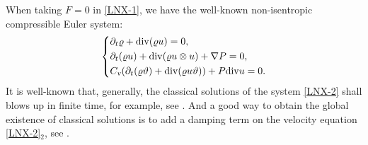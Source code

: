 \documentclass[reqno,11pt]{amsart}
\theoremstyle{plain}
\numberwithin{equation}{section}
\begin{document}
 
 
When taking $F = 0$ in \eqref{LNX-1}, we have the well-known non-isentropic compressible Euler system:
\begin{equation}\label{LNX-2}
\left\{\begin{aligned}& \partial_t \varrho+{\rm div}(\varrho u)=0, \\&\partial_t (\varrho u) 
+ {\rm div} (\varrho u \otimes u)  + \nabla P=0, \\
& C_\textsl{v}(\partial_t (\varrho \vartheta )
 + {\rm div} (\varrho u \vartheta )) + P {\rm div} u   =0.\end{aligned}\right.
\end{equation}  
It is well-known that, generally, the classical solutions of  the system \eqref{LNX-2} shall 
blows up in finite time, for example, see   \cite{ BSV-CPAM-23, Chen-JHDE-2011,CD-2024, MRRS-2022,Yin-2004}. 
And a good way to obtain the global existence of classical solutions is to add a damping term on the velocity
 equation \eqref{LNX-2}$_2$, see \cite{STW-2003-cpde, Zhang-Wu-2024}. 

%
\end{document}
